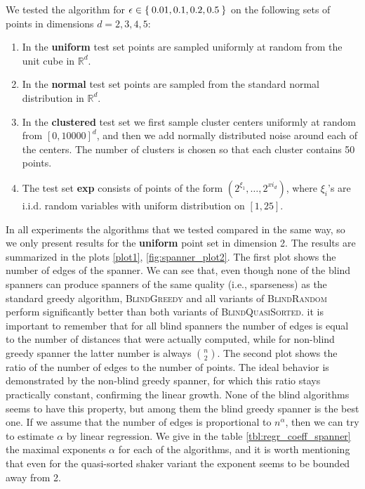 \documentclass[a4paper,USenglish]{socg-lipics-v2018}
\newcommand{\eps}{\epsilon}
\begin{document}
We tested the algorithm for $\eps \in \Set{0.01, 0.1, 0.2, 0.5}$ on the following sets of points in dimensions $d = 2,3,4,5$:
\begin{enumerate}
    \item In the \textbf{uniform} test set points are sampled uniformly at
        random from the unit cube in $\mathbb{R}^d$.
    \item In the \textbf{normal} test set points are sampled from the standard
        normal distribution in $\mathbb{R}^d$.
    \item In the \textbf{clustered} test set we first sample cluster centers uniformly 
        at random from $[0,10000]^d$, and then we add normally distributed noise around
        each of the centers. The number of clusters is chosen so that each cluster
        contains 50 points.
    \item The test set \textbf{exp} consists of points of the form $(2^{\xi_1}, \dots, 2^{xi_d})$,
        where $\xi_i$'s are i.i.d. random variables with uniform distribution on $[1,25]$.
\end{enumerate}
In all experiments the algorithms that we tested compared in the same way,
so we only present results for the \textbf{uniform} point set in dimension 2.
The results are summarized in the plots \ref{plot1}, \ref{fig:spanner_plot2}.
The first plot shows the number of edges of the spanner.
We can see that, even though none of the blind spanners can produce
spanners of the same quality (i.e., sparseness) as the standard greedy algorithm,
\textsc{BlindGreedy} and all variants of \textsc{BlindRandom}
perform significantly better than both variants of \textsc{BlindQuasiSorted}.
it is important to remember that for all blind spanners the number of edges
is equal to the number of distances that were actually computed, while
for non-blind greedy spanner the latter number is always $n \choose 2$.
The second plot shows the ratio of the number of edges to the number of points.
The ideal behavior is demonstrated by the non-blind greedy spanner,
for which this ratio stays practically constant, confirming the linear growth.
None of the blind algorithms seems to have this property, but among them
the blind greedy spanner is the best one. If we assume that the number of edges
is proportional to $n^\alpha$, then we can try to estimate $\alpha$ by 
linear regression.  We give in the table \ref{tbl:regr_coeff_spanner}
the maximal exponents $\alpha$ for each of the algorithms,
and it is worth mentioning that even for the quasi-sorted shaker variant 
the exponent seems to be bounded away from 2.
\end{document}
